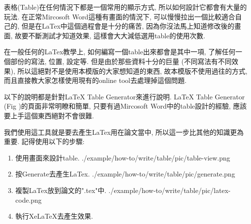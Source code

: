 
表格(Table)在任何情況下都是一個常用的顯示方式, 所以如何設計它都會有大量的玩法. 在正常Mircosoft Word這種有畫面的情況下, 可以慢慢拉出一個比較適合自己的, 但是在LaTex中這個過程會是十分的痛苦, 因為你沒法馬上知道修改後的畫面, 故要不斷測試才知道效果, 這樣會大大減低選用table的使用次數.

在一般任何的LaTex教學上, 如何編寫一個table出來都會是其中一項, 了解任何一個部份的寫法, 位置, 設定等. 但是由於那些資料十分的巨量 (不同寫法有不同效果), 所以這絕對不是使用本模版的大家想知道的東西, 故本模版不使用過往的方式, 而且直接教大家怎樣使用現有的online tool去處理掉這個問題.

以下的說明都是針對LaTeX Table Generator來進行說明. LaTeX Table Generator (Fig )的頁面非常明瞭和簡單, 只要有過Mircosoft Word中的table設計的經驗, 應該要上手這個東西絕對不會很難.


\newpage
{}

  我們使用這工具就是要去產生LaTex用在論文當中, 所以這一步比其他的知識更為重要. 記得使用以下的步驟:

  \begin{enumerate}
  \item
  {
    使用畫面來設計table.
    \InsertFigure
      {./example/how-to/write/table/pic/table-view.png}
  } %

  \item
  {
    按Generate去產生LaTex.
    \InsertFigure
      {./example/how-to/write/table/pic/generate.png}
  } %

  \item
  {
    複製LaTex放到論文的".tex"中.
    \InsertFigure
      {./example/how-to/write/table/pic/latex-code.png}
  } %

  \item
  {
    執行XeLaTeX去產生效果.
  } %
  \end{enumerate}

